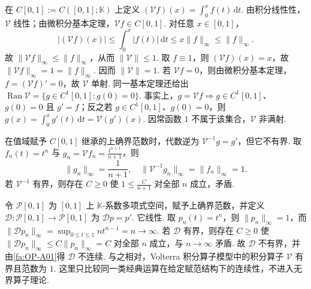 \begin{FAExample}[Volterra积分算子]\label{i05:ex-volterra}
在 \(\displaystyle C[0,1]:=C([0,1];\mathbb K)\) 上定义 \(\displaystyle (\mathcal V f)(x)=\int_0^x f(t)\,\mathrm{d}t\).
由积分线性性，\(\displaystyle \mathcal V\) 线性；由微积分基本定理，\(\displaystyle \mathcal V f\in C[0,1]\). 对任意 \(\displaystyle x\in[0,1]\)，
\[
|(\mathcal V f)(x)|
\leqslant\int_0^x|f(t)|\,\mathrm{d}t
\leqslant x\|f\|_\infty
\leqslant\|f\|_\infty.
\]
故 \(\displaystyle \|\mathcal V f\|_\infty\leqslant\|f\|_\infty\)，从而 \(\displaystyle \|\mathcal V\|\leqslant1\). 取 \(\displaystyle f\equiv1\)，则 \(\displaystyle (\mathcal V f)(x)=x\)，故 \(\displaystyle \|\mathcal V f\|_\infty=1=\|f\|_\infty\). 因而 \(\displaystyle \|\mathcal V\|=1\).
若 \(\displaystyle \mathcal V f=0\)，则由微积分基本定理，\(\displaystyle f=(\mathcal V f)'=0\)，故 \(\displaystyle \mathcal V\) 单射. 同一基本定理还给出 \(\displaystyle \operatorname{Ran}\mathcal V =\{g\in C^1[0,1]:g(0)=0\}\).
事实上，\(\displaystyle g=\mathcal V f\Rightarrow g\in C^1[0,1]\)、\(\displaystyle g(0)=0\) 且 \(\displaystyle g'=f\)；反之若 \(\displaystyle g\in C^1[0,1]\)、\(\displaystyle g(0)=0\)，则 \(\displaystyle g(x)=\int_0^x g'(t)\,\mathrm{d}t=\mathcal V(g')(x)\). 因常函数 \(\displaystyle1\) 不属于该集合，\(\displaystyle \mathcal V\) 非满射.

在值域赋予 \(\displaystyle C[0,1]\) 继承的上确界范数时，代数逆为 \(\displaystyle \mathcal V^{-1}g=g'\)，但它不有界. 取 \(\displaystyle f_n(t)=t^n\) 与 \(\displaystyle g_n=\mathcal V f_n=\frac{t^{n+1}}{n+1}\)，则
\[
\|g_n\|_\infty=\frac1{n+1},
\quad
\|\mathcal V^{-1}g_n\|_\infty=\|f_n\|_\infty=1.
\]
若 \(\displaystyle \mathcal V^{-1}\) 有界，则存在 \(\displaystyle C\geqslant0\) 使 \(\displaystyle1\leqslant \frac{C}{n+1}\) 对全部 \(\displaystyle n\) 成立，矛盾.
\end{FAExample}

\begin{FAApplication}[积分有界而微分可不有界]\label{i05:diff-int-contrast}
令 \(\displaystyle \mathcal P[0,1]\) 为 \(\displaystyle[0,1]\) 上 \(\displaystyle \mathbb K\)-系数多项式空间，赋予上确界范数，并定义 \(\displaystyle \mathcal D:\mathcal P[0,1]\to\mathcal P[0,1]\) 为 \(\displaystyle \mathcal Dp=p'\). 它线性. 取 \(\displaystyle p_n(t)=t^n\)，则 \(\displaystyle \|p_n\|_\infty=1\)，而 \(\displaystyle \|\mathcal Dp_n\|_\infty =\sup_{0\leqslant t\leqslant1}n t^{n-1} =n \to\infty\).
若 \(\displaystyle \mathcal D\) 有界，则存在 \(\displaystyle C\geqslant0\) 使 \(\displaystyle \|\mathcal Dp_n\|_\infty\leqslant C\|p_n\|_\infty=C\) 对全部 \(\displaystyle n\) 成立，与 \(\displaystyle n\to\infty\) 矛盾. 故 \(\displaystyle \mathcal D\) 不有界，并由\autoref{fa:OP-A01}得 \(\displaystyle \mathcal D\) 不连续. 与之相对，Volterra 积分算子模型中的积分算子 \(\displaystyle \mathcal V\) 有界且范数为 \(\displaystyle1\). 这里只比较同一类经典运算在给定赋范结构下的连续性，不进入无界算子理论.
\end{FAApplication}

